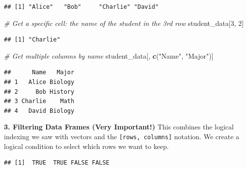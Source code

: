 \documentclass[
  11pt,
]{article}
\newenvironment{Shaded}{\begin{snugshade}}{\end{snugshade}}
\newcommand{\CommentTok}[1]{\textcolor[rgb]{0.56,0.35,0.01}{\textit{#1}}}
\newcommand{\DecValTok}[1]{\textcolor[rgb]{0.00,0.00,0.81}{#1}}
\newcommand{\FunctionTok}[1]{\textcolor[rgb]{0.13,0.29,0.53}{\textbf{#1}}}
\newcommand{\NormalTok}[1]{#1}
\newcommand{\OtherTok}[1]{\textcolor[rgb]{0.56,0.35,0.01}{#1}}
\newcommand{\SpecialCharTok}[1]{\textcolor[rgb]{0.81,0.36,0.00}{\textbf{#1}}}
\newcommand{\StringTok}[1]{\textcolor[rgb]{0.31,0.60,0.02}{#1}}
\begin{document}
\begin{verbatim}
## [1] "Alice"   "Bob"     "Charlie" "David"
\end{verbatim}

\begin{Shaded}
\begin{Highlighting}[]
\CommentTok{\# Get a specific cell: the name of the student in the 3rd row}
\NormalTok{student\_data[}\DecValTok{3}\NormalTok{, }\DecValTok{2}\NormalTok{]}
\end{Highlighting}
\end{Shaded}

\begin{verbatim}
## [1] "Charlie"
\end{verbatim}

\begin{Shaded}
\begin{Highlighting}[]
\CommentTok{\# Get multiple columns by name}
\NormalTok{student\_data[, }\FunctionTok{c}\NormalTok{(}\StringTok{"Name"}\NormalTok{, }\StringTok{"Major"}\NormalTok{)]}
\end{Highlighting}
\end{Shaded}

\begin{verbatim}
##      Name   Major
## 1   Alice Biology
## 2     Bob History
## 3 Charlie    Math
## 4   David Biology
\end{verbatim}

\textbf{3. Filtering Data Frames (Very Important!)} This combines the
logical indexing we saw with vectors and the
\texttt{{[}rows,\ columns{]}} notation. We create a logical condition to
select which rows we want to keep.

\begin{Shaded}
\end{Shaded}

\begin{verbatim}
## [1]  TRUE  TRUE FALSE FALSE
\end{verbatim}

\begin{Shaded}
\end{Shaded}
\end{document}
